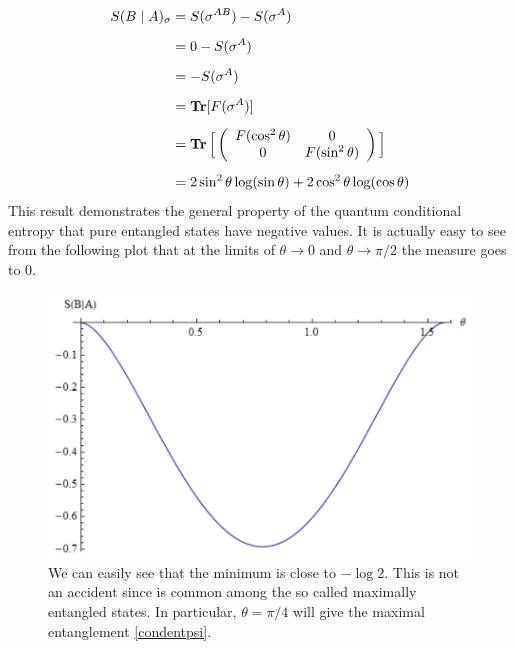 \begin{itemize}
\begin{align}
S(B \mid A)_{\sigma}&=S(\sigma^{AB})-S(\sigma^A)
\nonumber \\[0.5em] &=0-S(\sigma^A) \nonumber \\[0.5em]
&=-S(\sigma^A) \nonumber \\[0.5em]
&=\operatorname{\textup{\textbf{Tr}}}[F(\sigma^{A})] \nonumber \\[0.5em]
&= \operatorname{\textup{\textbf{Tr}}} \Big[
\left( \begin{array}{cccc}
 F(\cos^2 \theta) & 0  \\
 0 & F(\sin^2 \theta)  \\
\end{array}
\right)
\Big]
\nonumber \\[0.5em]
&= 
2 \sin ^2 \theta  \log (\sin \theta )+2 \cos ^2 \theta  \log (\cos \theta )
\end{align}
This result demonstrates the general property of the quantum conditional entropy that pure entangled states have negative values. It is actually easy to see from the following plot that at the limits of $\theta \rightarrow 0$ and $
\theta \rightarrow \pi /2$ the measure goes to 0.
\begin{figure}[H]
\label{figure2}
\begin{center}
\includegraphics[scale=0.9]{figures/cond_ent_plot.png}
\caption{We can easily see that the minimum is close to $-\log2$. This is not an accident since is common among the so called maximally entangled states. In particular, $\theta= \pi /4$ will give the maximal entanglement \eqref{condentpsi}.}\label{figuraki6}
\end{center}
\end{figure}
\end{itemize}
